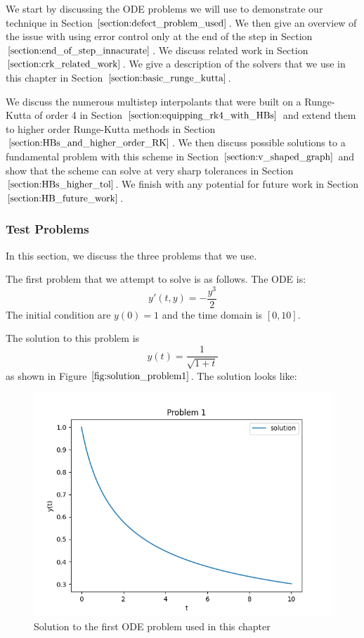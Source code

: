 \documentclass{article}
\begin{document}
We start by discussing the ODE problems we will use to demonstrate our technique in Section $\ref{section:defect_problem_used}$. We then give an overview of the issue with using error control only at the end of the step in Section $\ref{section:end_of_step_innacurate}$. We discuss related work in Section $\ref{section:crk_related_work}$. We give a description of the solvers that we use in this chapter in Section $\ref{section:basic_runge_kutta}$. 

We discuss the numerous multistep interpolants that were built on a Runge-Kutta of order 4 in Section $\ref{section:equipping_rk4_with_HBs}$ and extend them to higher order Runge-Kutta methods in Section $\ref{section:HBs_and_higher_order_RK}$. We then discuss possible solutions to a fundamental problem with this scheme in Section $\ref{section:v_shaped_graph}$ and show that the scheme can solve at very sharp tolerances in Section $\ref{section:HBs_higher_tol}$. We finish with any potential for future work in Section $\ref{section:HB_future_work}$.

\subsubsection{Test Problems}
\label{section:defect_problem_used}
In this section, we discuss the three problems that we use. 

The first problem that we attempt to solve is as follows.
The ODE is:
\begin{equation}
y'(t, y) = - \frac{y^{3}}{2} 
\end{equation}
The initial condition are $y(0) = 1$ and the time domain is $[0, 10]$.

The solution to this problem is
\begin{equation}
y(t) = \frac{1}{\sqrt{1 + t}}
\end{equation}
as shown in Figure $\ref{fig:solution_problem1}$.
The solution looks like:
\begin{figure}[H]
\centering
\includegraphics[width=0.7\linewidth]{./figures/solution_problem1}
\caption{Solution to the first ODE problem used in this chapter}
\label{fig:solution_problem1}
\end{figure}
\end{document}
